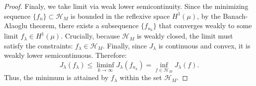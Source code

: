 \documentclass[11pt]{article}
\newcommand{\cH}{\mathcal{H}}
\theoremstyle{plain}
\theoremstyle{definition}
\theoremstyle{remark}
\begin{document}
\begin{proof}
Finaly, we  take limit via weak lower semicontinuity.
Since the minimizing sequence $\{f_n\} \subset \cH_M$ is bounded in the reflexive space $H^1(\mu)$, by the Banach-Alaoglu theorem, there exists a subsequence $\{f_{n_k}\}$ that converges weakly to some limit $f_\lambda \in H^1(\mu)$.
Crucially, because $\cH_M$ is weakly closed, the limit must satisfy the constraints: $f_\lambda \in \cH_M$.
Finally, since $J_{\lambda}$ is continuous and convex, it is weakly lower semicontinuous. Therefore:
\begin{equation*}
    J_{\lambda}(f_\lambda) \le \liminf_{k \to \infty} J_{\lambda}(f_{n_k}) = \inf_{f \in \cH_M} J_{\lambda}(f).
\end{equation*}
Thus, the minimum is attained by $f_\lambda$ within the set $\cH_M$.
\end{proof}
\end{document}
